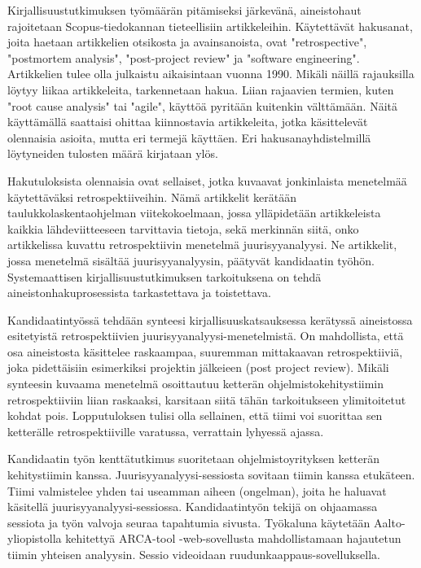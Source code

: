 Kirjallisuustutkimuksen työmäärän pitämiseksi järkevänä, aineistohaut rajoitetaan Scopus-tiedokannan tieteellisiin artikkeleihin. Käytettävät hakusanat, joita haetaan artikkelien otsikosta ja avainsanoista, ovat "retrospective", "postmortem analysis", "post-project review" ja "software engineering". Artikkelien tulee olla julkaistu aikaisintaan vuonna 1990. Mikäli näillä rajauksilla löytyy liikaa artikkeleita, tarkennetaan hakua. Liian rajaavien termien, kuten "root cause analysis" tai "agile", käyttöä pyritään kuitenkin välttämään. Näitä käyttämällä saattaisi ohittaa kiinnostavia artikkeleita, jotka käsittelevät olennaisia asioita, mutta eri termejä käyttäen. Eri hakusanayhdistelmillä löytyneiden tulosten määrä kirjataan ylös.

Hakutuloksista olennaisia ovat sellaiset, jotka kuvaavat jonkinlaista menetelmää käytettäväksi retrospektiiveihin. Nämä artikkelit kerätään taulukkolaskentaohjelman viitekokoelmaan, jossa ylläpidetään artikkeleista kaikkia lähdeviitteeseen tarvittavia tietoja, sekä merkinnän siitä, onko artikkelissa kuvattu retrospektiivin menetelmä juurisyyanalyysi. Ne artikkelit, jossa menetelmä sisältää juurisyyanalyysin, päätyvät kandidaatin työhön. Systemaattisen kirjallisuustutkimuksen tarkoituksena on tehdä aineistonhakuprosessista tarkastettava ja toistettava.

Kandidaatintyössä tehdään synteesi kirjallisuuskatsauksessa kerätyssä aineistossa esitetyistä retrospektiivien juurisyyanalyysi-menetelmistä. On mahdollista, että osa aineistosta käsittelee raskaampaa, suuremman mittakaavan retrospektiiviä, joka pidettäisiin esimerkiksi projektin jälkeieen (post project review). Mikäli synteesin kuvaama menetelmä osoittautuu ketterän ohjelmistokehitystiimin retrospektiiviin liian raskaaksi, karsitaan siitä tähän tarkoitukseen ylimitoitetut kohdat pois. Lopputuloksen tulisi olla sellainen, että tiimi voi suorittaa sen ketterälle retrospektiiville varatussa, verrattain lyhyessä ajassa.

Kandidaatin työn kenttätutkimus suoritetaan ohjelmistoyrityksen ketterän kehitystiimin kanssa. Juurisyyanalyysi-sessiosta sovitaan tiimin kanssa etukäteen. Tiimi valmistelee yhden tai useamman aiheen (ongelman), joita he haluavat käsitellä juurisyyanalyysi-sessiossa. Kandidaatintyön tekijä on ohjaamassa sessiota ja työn valvoja seuraa tapahtumia sivusta. Työkaluna käytetään Aalto-yliopistolla kehitettyä ARCA-tool -web-sovellusta mahdollistamaan hajautetun tiimin yhteisen analyysin. Sessio videoidaan ruudunkaappaus-sovelluksella. 

